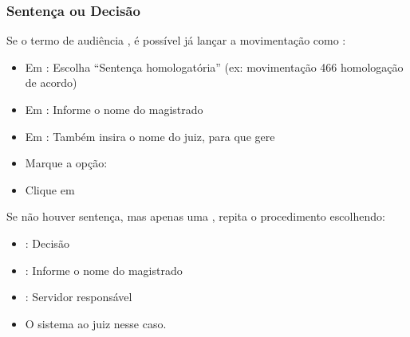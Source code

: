 \documentclass[letterpaper,10pt,brazil]{sphinxmanual}
\begin{document}
\subsubsection{Sentença ou Decisão}
\label{\detokenize{projud_47_movimentacaoaudiencia:sentenca-ou-decisao}}
\sphinxAtStartPar
Se o termo de audiência , é possível já lançar a movimentação como :
\begin{itemize}
\item {} 
\sphinxAtStartPar
Em :
\sphinxhyphen{} Escolha “Sentença homologatória” (ex: movimentação 466 \textendash{} homologação de acordo)

\item {} 
\sphinxAtStartPar
Em :
\sphinxhyphen{} Informe o nome do magistrado

\item {} 
\sphinxAtStartPar
Em :
\sphinxhyphen{} Também insira o nome do juiz, para que gere 

\item {} 
\sphinxAtStartPar
Marque a opção: 

\item {} 
\sphinxAtStartPar
Clique em 

\end{itemize}

\sphinxAtStartPar
Se não houver sentença, mas apenas uma , repita o procedimento escolhendo:
\begin{itemize}
\item {} 
\sphinxAtStartPar
{}: Decisão

\item {} 
\sphinxAtStartPar
{}: Informe o nome do magistrado

\item {} 
\sphinxAtStartPar
{}: Servidor responsável

\item {} 
\sphinxAtStartPar
O sistema  ao juiz nesse caso.

\end{itemize}
\end{document}
